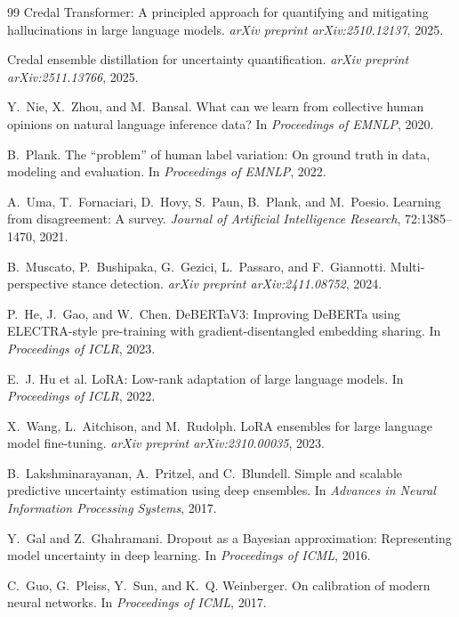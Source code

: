 \documentclass[11pt,a4paper]{article}
\begin{document}
\begin{thebibliography}{99}
Credal Transformer: A principled approach for quantifying and mitigating hallucinations in large language models.
\newblock \emph{arXiv preprint arXiv:2510.12137}, 2025.

Credal ensemble distillation for uncertainty quantification.
\newblock \emph{arXiv preprint arXiv:2511.13766}, 2025.

Y.~Nie, X.~Zhou, and M.~Bansal.
\newblock What can we learn from collective human opinions on natural language inference data?
\newblock In \emph{Proceedings of EMNLP}, 2020.

B.~Plank.
\newblock The ``problem'' of human label variation: On ground truth in data, modeling and evaluation.
\newblock In \emph{Proceedings of EMNLP}, 2022.

A.~Uma, T.~Fornaciari, D.~Hovy, S.~Paun, B.~Plank, and M.~Poesio.
\newblock Learning from disagreement: A survey.
\newblock \emph{Journal of Artificial Intelligence Research}, 72:1385--1470, 2021.

B.~Muscato, P.~Bushipaka, G.~Gezici, L.~Passaro, and F.~Giannotti.
\newblock Multi-perspective stance detection.
\newblock \emph{arXiv preprint arXiv:2411.08752}, 2024.

P.~He, J.~Gao, and W.~Chen.
\newblock DeBERTaV3: Improving DeBERTa using ELECTRA-style pre-training with gradient-disentangled embedding sharing.
\newblock In \emph{Proceedings of ICLR}, 2023.

E.~J. Hu et al.
\newblock LoRA: Low-rank adaptation of large language models.
\newblock In \emph{Proceedings of ICLR}, 2022.

X.~Wang, L.~Aitchison, and M.~Rudolph.
\newblock LoRA ensembles for large language model fine-tuning.
\newblock \emph{arXiv preprint arXiv:2310.00035}, 2023.

B.~Lakshminarayanan, A.~Pritzel, and C.~Blundell.
\newblock Simple and scalable predictive uncertainty estimation using deep ensembles.
\newblock In \emph{Advances in Neural Information Processing Systems}, 2017.

Y.~Gal and Z.~Ghahramani.
\newblock Dropout as a Bayesian approximation: Representing model uncertainty in deep learning.
\newblock In \emph{Proceedings of ICML}, 2016.

C.~Guo, G.~Pleiss, Y.~Sun, and K.~Q. Weinberger.
\newblock On calibration of modern neural networks.
\newblock In \emph{Proceedings of ICML}, 2017.


\end{thebibliography}
\end{document}
